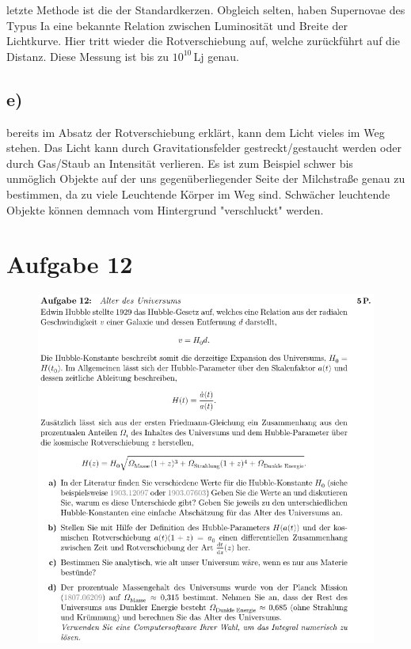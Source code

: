     \justifying letzte Methode ist die der Standardkerzen. Obgleich selten, haben Supernovae des Typus Ia eine bekannte 
    Relation zwischen Luminosität und Breite der Lichtkurve. Hier tritt wieder die Rotverschiebung auf, welche zurückführt auf die Distanz. 
    Diese Messung ist bis zu $10^{10}\,$Lj genau. 

    \subsection{e)}

    \justifying bereits im Absatz der Rotverschiebung erklärt, kann dem Licht vieles im Weg stehen. Das Licht kann
    durch Gravitationsfelder gestreckt/gestaucht werden oder durch Gas/Staub an Intensität verlieren. Es ist zum Beispiel schwer bis 
    unmöglich Objekte auf der uns gegenüberliegender Seite der Milchstraße genau zu bestimmen, da zu viele Leuchtende Körper im Weg sind.
    Schwächer leuchtende Objekte können demnach vom Hintergrund "verschluckt" werden. 

\section{Aufgabe 12}

    \begin{figure}[H]
        \centering
        \includegraphics[width=\textwidth]{images/Aufgabe12.jpg}
        \label{fig:6}
    \end{figure}

